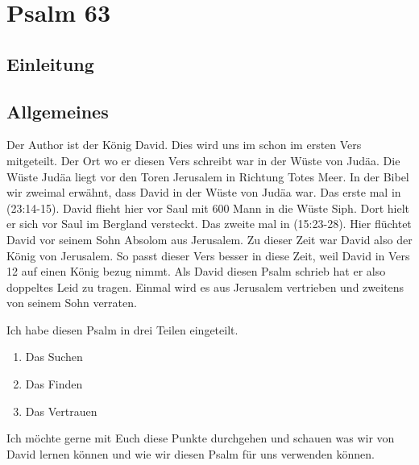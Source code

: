 \documentclass[14pt]{../../inc/mybib}
\author{Lothar Schmid}
\begin{document}
\setlength{\baselineskip}{1.5\baselineskip}

\section*{Psalm 63}
    \subsection{Einleitung}
    \subsection{Allgemeines}
    \begin{block}[Allgemeines]
    Der Author ist der König David. Dies wird uns im schon im ersten Vers mitgeteilt. Der Ort wo er diesen Vers schreibt war in der Wüste von Judäa. Die Wüste Judäa liegt vor den Toren Jerusalem in Richtung Totes Meer. In der Bibel wir zweimal erwähnt, dass David in der Wüste von Judäa war. Das erste mal in (23:14-15). David flieht hier vor Saul mit 600 Mann in die Wüste Siph. Dort hielt er sich vor Saul im Bergland versteckt. Das zweite mal in (15:23-28). Hier flüchtet David vor seinem Sohn Absolom aus Jerusalem. Zu dieser Zeit war David also der König von Jerusalem. So passt dieser Vers besser in diese Zeit, weil David in Vers 12 auf einen König bezug nimmt. Als David diesen Psalm schrieb hat er also doppeltes Leid zu tragen. Einmal wird es aus Jerusalem vertrieben und zweitens von seinem Sohn verraten.
    \end{block}
    \begin{block}
        Ich habe diesen Psalm in drei Teilen eingeteilt. 
        \begin{enumerate}
            \item Das Suchen 
            \item Das Finden 
            \item Das Vertrauen 
        \end{enumerate}
        Ich möchte gerne mit Euch diese Punkte durchgehen und schauen was wir von David lernen können und wie wir diesen Psalm für uns verwenden können.
    \end{block}
\end{document}
